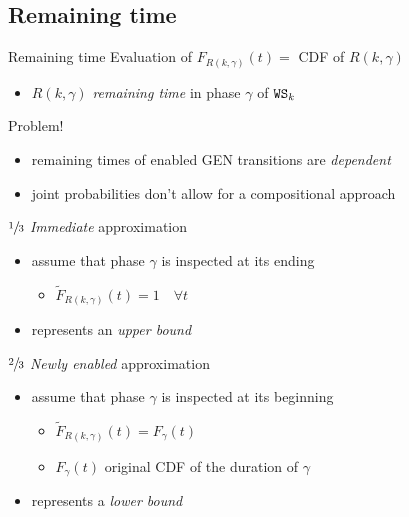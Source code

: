   \subsection{Remaining time}
    \begin{frame}{Remaining time}
      Evaluation of $F_{R(k,\gamma)}(t) = $ CDF of $R(k,\gamma)$
      \begin{itemize}
        \item $R(k,\gamma)$ \textit{remaining time} in phase $\gamma$ of $\mathtt{WS}_k$
      \end{itemize}
      
      \vspace{1em}
      Problem!
      \begin{itemize}
        \item remaining times of enabled GEN transitions are \textit{dependent}
        \item joint probabilities don't allow for a compositional approach
      \end{itemize}
      
      \vspace{1em}
      $\sfrac{1}{3}$ \textit{Immediate} approximation
      \begin{itemize}
        \item assume that phase $\gamma$ is inspected at its ending
        \begin{itemize}
          \item $\tilde{F}_{R(k, \gamma)}(t) = 1 \quad \forall t$
        \end{itemize}
        \item represents an \textit{upper bound}
      \end{itemize}
      
      \vspace{1em}
      $\sfrac{2}{3}$ \textit{Newly enabled} approximation
      \begin{itemize}
        \item assume that phase $\gamma$ is inspected at its beginning
        \begin{itemize}
          \item $\tilde{F}_{R(k, \gamma)}(t) = F_{\gamma}(t)$ 
          \item $F_{\gamma}(t)$ original CDF of the duration of $\gamma$
        \end{itemize}
        \item represents a \textit{lower bound}
      \end{itemize}
    \end{frame}
    
